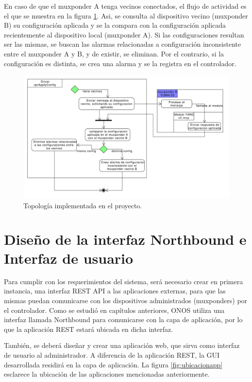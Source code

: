   En caso de que el muxponder A tenga vecinos conectados, el flujo de actividad es el que se muestra en la figura \ref{fig:actividad_driver_rpc_con_vecinos}. Asi, se consulta al dispositivo vecino (muxponder B) su configuración aplicada y se la compara con la configuración aplicada recientemente al dispositivo local (muxponder A). Si las configuraciones resultan ser las mismas, se buscan las alarmas relacionadas a configuración inconsistente entre el muxponder A y B, y de existir, se eliminan. Por el contrario, si la configuración es distinta, se crea una alarma y se la registra en el controlador.

  \begin{figure}[H]
    \centering
    \includegraphics[scale=0.45]{Figures/actividad_driver_rpc_con_vecinos.pdf}
    \caption{Topología implementada en el proyecto.}
    \label{fig:actividad_driver_rpc_con_vecinos}
  \end{figure}

  \section{Diseño de la interfaz Northbound e Interfaz de usuario}
  Para cumplir con los requerimientos del sistema, será necesario crear en primera instancia, una interfaz REST API a las aplicaciones externas, para que las mismas puedan comunicarse con los dispositivos administrados (muxponders) por el controlador. Como se estudió en capítulos anteriores, ONOS utiliza una interfaz llamada Northbound para comunicarse con la capa de aplicación, por lo que la aplicación REST estará ubicada en dicha interfaz. 

  También, se deberá diseñar y crear una aplicación web, que sirva como interfaz de usuario al administrador. A diferencia de la aplicación REST, la GUI desarrollada residirá en la capa de aplicación. La figura \ref{fig:ubicacionapp} esclarece la ubicación de las aplicaciones mencionadas anteriormente. 

